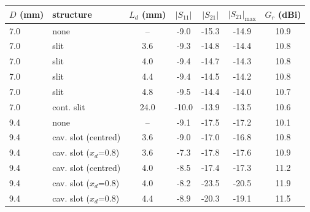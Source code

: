 \begin{tabular}{@{}llccccc@{}}\toprule
$D$ (mm) & structure & $L_d$ (mm) & $|S_{11}|$ & $|S_{21}|$ & $|S_{21}|_{\max}$ & $G_r$ (dBi)\\\midrule
7.0 & none & -- & -9.0 & -15.3 & -14.9 & 10.9\\
7.0 & slit & 3.6 & -9.3 & -14.8 & -14.4 & 10.8\\
7.0 & slit & 4.0 & -9.4 & -14.7 & -14.3 & 10.8\\
7.0 & slit & 4.4 & -9.4 & -14.5 & -14.2 & 10.8\\
7.0 & slit & 4.8 & -9.5 & -14.4 & -14.0 & 10.7\\
7.0 & cont. slit & 24.0 & -10.0 & -13.9 & -13.5 & 10.6\\
9.4 & none & -- & -9.1 & -17.5 & -17.2 & 10.1\\
9.4 & cav. slot (centred) & 3.6 & -9.0 & -17.0 & -16.8 & 10.8\\
9.4 & cav. slot ($x_d$=0.8) & 3.6 & -7.3 & -17.8 & -17.6 & 10.9\\
9.4 & cav. slot (centred) & 4.0 & -8.5 & -17.4 & -17.3 & 11.2\\
9.4 & cav. slot ($x_d$=0.8) & 4.0 & -8.2 & -23.5 & -20.5 & 11.9\\
9.4 & cav. slot ($x_d$=0.8) & 4.4 & -8.9 & -20.3 & -19.1 & 11.5\\
\bottomrule\end{tabular}
